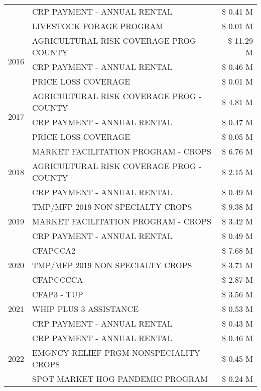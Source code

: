 \begin{tabular}{llr}
 & CRP PAYMENT - ANNUAL RENTAL & \$ 0.41 M \\
 & LIVESTOCK FORAGE PROGRAM & \$ 0.01 M \\
\cline{1-3}
\multirow[t]{3}{*}{2016} & AGRICULTURAL RISK COVERAGE PROG - COUNTY & \$ 11.29 M \\
 & CRP PAYMENT - ANNUAL RENTAL & \$ 0.46 M \\
 & PRICE LOSS COVERAGE & \$ 0.01 M \\
\cline{1-3}
\multirow[t]{3}{*}{2017} & AGRICULTURAL RISK COVERAGE PROG - COUNTY & \$ 4.81 M \\
 & CRP PAYMENT - ANNUAL RENTAL & \$ 0.47 M \\
 & PRICE LOSS COVERAGE & \$ 0.05 M \\
\cline{1-3}
\multirow[t]{3}{*}{2018} & MARKET FACILITATION PROGRAM - CROPS & \$ 6.76 M \\
 & AGRICULTURAL RISK COVERAGE PROG - COUNTY & \$ 2.15 M \\
 & CRP PAYMENT - ANNUAL RENTAL & \$ 0.49 M \\
\cline{1-3}
\multirow[t]{3}{*}{2019} & TMP/MFP 2019 NON SPECIALTY CROPS & \$ 9.38 M \\
 & MARKET FACILITATION PROGRAM - CROPS & \$ 3.42 M \\
 & CRP PAYMENT - ANNUAL RENTAL & \$ 0.49 M \\
\cline{1-3}
\multirow[t]{3}{*}{2020} & CFAPCCA2 & \$ 7.68 M \\
 & TMP/MFP 2019 NON SPECIALTY CROPS & \$ 3.71 M \\
 & CFAPCCCCA & \$ 2.87 M \\
\cline{1-3}
\multirow[t]{3}{*}{2021} & CFAP3 - TUP & \$ 3.56 M \\
 & WHIP PLUS 3 ASSISTANCE & \$ 0.53 M \\
 & CRP PAYMENT - ANNUAL RENTAL & \$ 0.43 M \\
\cline{1-3}
\multirow[t]{3}{*}{2022} & CRP PAYMENT - ANNUAL RENTAL & \$ 0.46 M \\
 & EMGNCY RELIEF PRGM-NONSPECIALITY CROPS & \$ 0.45 M \\
 & SPOT MARKET HOG PANDEMIC PROGRAM & \$ 0.24 M \\
\cline{1-3}
\bottomrule
\end{tabular}
